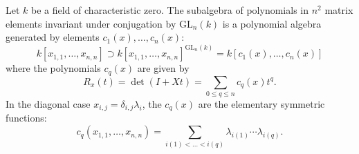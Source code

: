 Let $k$ be a field of characteristic zero. The subalgebra of polynomials in $n^2$ matrix elements invariant under conjugation by $\text{GL}_n(k)$ is a polynomial algebra generated by elements $c_1(x), \ldots, c_n(x)$:
$$
k[x_{1,1}, \ldots, x_{n,n}] \supset k[x_{1,1}, \ldots, x_{n,n}]^{\text{GL}_n(k)} = k[c_1(x), \ldots, c_n(x)]
$$
where the polynomials $c_q(x)$ are given by
$$
R_x(t) = \det(I + Xt) = \sum_{0 \leq q \leq n} c_q(x) t^q.
$$
In the diagonal case $x_{i,j} = \delta_{i,j}\lambda_i$, the $c_q(x)$ are the elementary symmetric functions:
$$
c_q(x_{1,1}, \ldots, x_{n,n}) = \sum_{i(1) < \ldots < i(q)} \lambda_{i(1)} \cdots \lambda_{i(q)}.
$$

